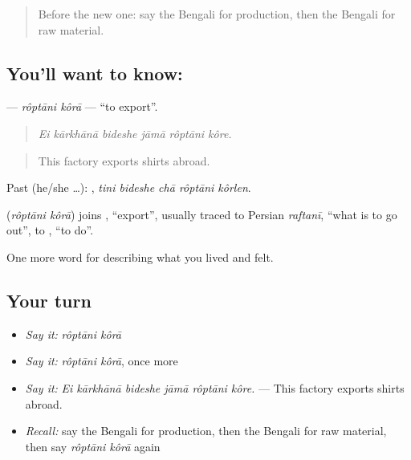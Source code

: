 \label{lesson:BN-C499-roptani-kora}



\begin{quote}
Before the new one: say the Bengali for production, then the Bengali for raw material.
\end{quote}

\subsection*{You'll want to know:  }
\textbf{ } — \emph{rôptāni kôrā} — \textquotedblleft{}to export\textquotedblright{}.

\begin{quote}
     
\end{quote}

\begin{quote}
\emph{Ei kārkhānā bideshe jāmā rôptāni kôre.}
\end{quote}

\begin{quote}
This factory exports shirts abroad.
\end{quote}

Past (he/she …):     , \emph{tini bideshe chā rôptāni kôrlen}.

\begin{cousinweb}
\textbf{ } (\emph{rôptāni kôrā}) joins , \textquotedblleft{}export\textquotedblright{}, usually traced to Persian \emph{raftanī}, \textquotedblleft{}what is to go out\textquotedblright{}, to , \textquotedblleft{}to do\textquotedblright{}.
\end{cousinweb}

\begin{grammarlens}[title={What you've built}]
One more word for describing what you lived and felt.
\end{grammarlens}

\subsection*{Your turn}
\begin{itemize}
\raggedright
  \item \emph{Say it:} \emph{rôptāni kôrā}
  \item \emph{Say it:} \emph{rôptāni kôrā}, once more
  \item \emph{Say it:} \emph{Ei kārkhānā bideshe jāmā rôptāni kôre.} — This factory exports shirts abroad.
  \item \emph{Recall:} say the Bengali for production, then the Bengali for raw material, then say \emph{rôptāni kôrā} again
\end{itemize}

